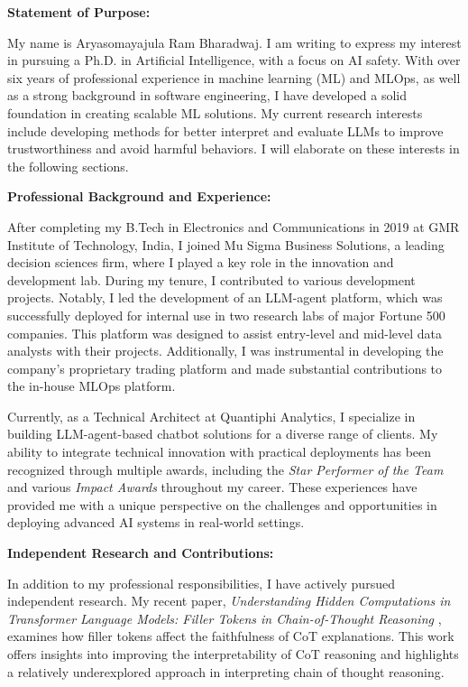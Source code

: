 \documentclass[12pt]{article}
\begin{document}
\textbf{Statement of Purpose:}

My name is Aryasomayajula Ram Bharadwaj. I am writing to express my interest in pursuing a Ph.D. in Artificial Intelligence, with a focus on AI safety. With over six years of professional experience in machine learning (ML) and MLOps, as well as a strong background in software engineering, I have developed a solid foundation in creating scalable ML solutions. My current research interests include developing methods for better interpret and evaluate LLMs to improve trustworthiness and avoid harmful behaviors. I will elaborate on these interests in the following sections.

\textbf{Professional Background and Experience:}

After completing my B.Tech in Electronics and Communications in 2019 at GMR Institute of Technology, India, I joined Mu Sigma Business Solutions, a leading decision sciences firm, where I played a key role in the innovation and development lab. During my tenure, I contributed to various development projects. Notably, I led the development of an LLM-agent platform, which was successfully deployed for internal use in two research labs of major Fortune 500 companies. This platform was designed to assist entry-level and mid-level data analysts with their projects. Additionally, I was instrumental in developing the company's proprietary trading platform and made substantial contributions to the in-house MLOps platform.

Currently, as a Technical Architect at Quantiphi Analytics, I specialize in building LLM-agent-based chatbot solutions for a diverse range of clients. My ability to integrate technical innovation with practical deployments has been recognized through multiple awards, including the \emph{Star Performer of the Team} and various \emph{Impact Awards} throughout my career. These experiences have provided me with a unique perspective on the challenges and opportunities in deploying advanced AI systems in real-world settings.

\newpage
\textbf{Independent Research and Contributions:}

In addition to my professional responsibilities, I have actively pursued independent research. My recent paper, \emph{Understanding Hidden Computations in Transformer Language Models: Filler Tokens in Chain-of-Thought Reasoning} \cite{bharadwaj2024}, examines how filler tokens affect the faithfulness of CoT explanations. This work offers insights into improving the interpretability of CoT reasoning and highlights a relatively underexplored approach in interpreting chain of thought reasoning.
\end{document}
